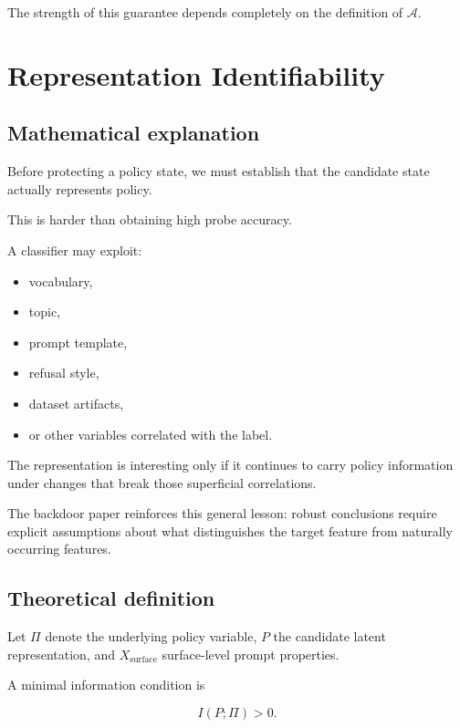 \documentclass[11pt]{article}
\begin{document}
The strength of this guarantee depends completely on the definition of
$\mathcal A$.

\section{Representation Identifiability}

\subsection*{Mathematical explanation}

Before protecting a policy state, we must establish that the candidate state
actually represents policy.

This is harder than obtaining high probe accuracy.

A classifier may exploit:

\begin{itemize}
    \item vocabulary,
    \item topic,
    \item prompt template,
    \item refusal style,
    \item dataset artifacts,
    \item or other variables correlated with the label.
\end{itemize}

The representation is interesting only if it continues to carry policy
information under changes that break those superficial correlations.

The backdoor paper reinforces this general lesson: robust conclusions require
explicit assumptions about what distinguishes the target feature from
naturally occurring features.

\subsection*{Theoretical definition}

Let $\Pi$ denote the underlying policy variable, $P$ the candidate latent
representation, and $X_{\mathrm{surface}}$ surface-level prompt properties.

A minimal information condition is

\begin{equation}
\boxed{
I(P;\Pi)>0.
}
\end{equation}
\end{document}
